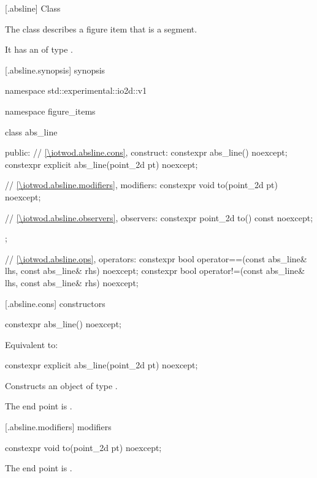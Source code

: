 [\iotwod.absline] {Class }

\pnum
{}%
The class  describes a figure item that is a segment.

\pnum
It has an  of type .

 [\iotwod.absline.synopsis] { synopsis}

\begin{codeblock}
namespace std::experimental::io2d::v1 {
  namespace figure_items {
    class abs_line {
    public:
      // \ref{\iotwod.absline.cons}, construct:
      constexpr abs_line() noexcept;
      constexpr explicit abs_line(point_2d pt) noexcept;

      // \ref{\iotwod.absline.modifiers}, modifiers:
      constexpr void to(point_2d pt) noexcept;

      // \ref{\iotwod.absline.observers}, observers:
      constexpr point_2d to() const noexcept;
    };
    
    // \ref{\iotwod.absline.ops}, operators:
    constexpr bool operator==(const abs_line& lhs, const abs_line& rhs) 
      noexcept;
    constexpr bool operator!=(const abs_line& lhs, const abs_line& rhs) 
      noexcept;
  }
}
\end{codeblock}

 [\iotwod.absline.cons] { constructors}

%
\begin{itemdecl}
constexpr abs_line() noexcept;
\end{itemdecl}
\begin{itemdescr}
\pnum
\effects
Equivalent to: 
\end{itemdescr}

%
\begin{itemdecl}
constexpr explicit abs_line(point_2d pt) noexcept;
\end{itemdecl}
\begin{itemdescr}
\pnum
\effects
Constructs an object of type .

\pnum
The end point is .
\end{itemdescr}

 [\iotwod.absline.modifiers]{ modifiers}

%
\begin{itemdecl}
constexpr void to(point_2d pt) noexcept;
\end{itemdecl}
\begin{itemdescr}
\pnum
\effects
The end point is .
\end{itemdescr}

